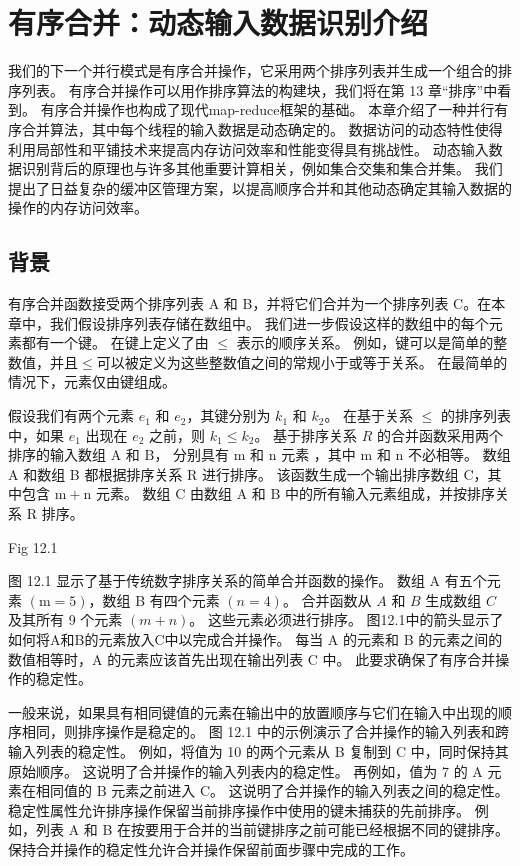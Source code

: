 \section{有序合并：动态输入数据识别介绍}
我们的下一个并行模式是有序合并操作，它采用两个排序列表并生成一个组合的排序列表。 
有序合并操作可以用作排序算法的构建块，我们将在第 13 章“排序”中看到。 有序合并操作也构成了现代map-reduce框架的基础。 
本章介绍了一种并行有序合并算法，其中每个线程的输入数据是动态确定的。 
数据访问的动态特性使得利用局部性和平铺技术来提高内存访问效率和性能变得具有挑战性。 
动态输入数据识别背后的原理也与许多其他重要计算相关，例如集合交集和集合并集。 
我们提出了日益复杂的缓冲区管理方案，以提高顺序合并和其他动态确定其输入数据的操作的内存访问效率。

\subsection{背景}
有序合并函数接受两个排序列表 A 和 B，并将它们合并为一个排序列表 C。在本章中，我们假设排序列表存储在数组中。 
我们进一步假设这样的数组中的每个元素都有一个键。 在键上定义了由 $\leq$ 表示的顺序关系。 
例如，键可以是简单的整数值，并且$\leq$可以被定义为这些整数值之间的常规小于或等于关系。 在最简单的情况下，元素仅由键组成。

假设我们有两个元素 $e_{1}$ 和 $e_{2}$，其键分别为 $k_{1}$ 和 $k_{2}$。 
在基于关系 $\leq$ 的排序列表中，如果 $e_{1}$ 出现在 $e_{2}$ 之前，则 $k_{1} \leq k_{2}$。 
基于排序关系 $R$ 的合并函数采用两个排序的输入数组 $\mathrm{A}$ 和 $\mathrm{B}$，
分别具有 $\mathrm{m}$ 和 $\mathrm{n}$ 元素 ，其中 $\mathrm{m}$ 和 $\mathrm{n}$ 不必相等。 
数组 A 和数组 B 都根据排序关系 $\mathrm{R}$ 进行排序。 
该函数生成一个输出排序数组 $\mathrm{C}$，其中包含 $\mathrm{m}+\mathrm{n}$ 元素。 
数组 $\mathrm{C}$ 由数组 $\mathrm{A}$ 和 $\mathrm{B}$ 中的所有输入元素组成，并按排序关系 $\mathrm{R}$ 排序。

{\color{red} Fig 12.1}

图 12.1 显示了基于传统数字排序关系的简单合并函数的操作。 
数组 A 有五个元素 $(\mathrm{m}=5)$，数组 B 有四个元素 $(n=4)$。 
合并函数从 $A$ 和 $B$ 生成数组 $C$ 及其所有 9 个元素 $(m+n)$。 这些元素必须进行排序。 
图12.1中的箭头显示了如何将A和B的元素放入$\mathrm{C}$中以完成合并操作。 
每当 $\mathrm{A}$ 的元素和 B 的元素之间的数值相等时，A 的元素应该首先出现在输出列表 C 中。
此要求确保了有序合并操作的稳定性。

一般来说，如果具有相同键值的元素在输出中的放置顺序与它们在输入中出现的顺序相同，则排序操作是稳定的。 
图 12.1 中的示例演示了合并操作的输入列表和跨输入列表的稳定性。 
例如，将值为 10 的两个元素从 B 复制到 $\mathrm{C}$ 中，同时保持其原始顺序。 
这说明了合并操作的输入列表内的稳定性。 再例如，值为 7 的 A 元素在相同值的 $\mathrm{B}$ 元素之前进入 $\mathrm{C}$。 
这说明了合并操作的输入列表之间的稳定性。 稳定性属性允许排序操作保留当前排序操作中使用的键未捕获的先前排序。 
例如，列表 A 和 B 在按要用于合并的当前键排序之前可能已经根据不同的键排序。 
保持合并操作的稳定性允许合并操作保留前面步骤中完成的工作。


